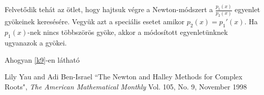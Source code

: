 \documentclass[a4paper,12pt]{report}
\begin{document}
			Felvetődik tehát az ötlet, hogy hajtsuk végre a Newton-módszert a $\frac{p_1(x)}{p_2(x)}$ egyenlet gyökeinek keresésére. Vegyük azt a speciális esetet amikor $p_2(x)=p_1'(x)$. Ha $p_1(x)$-nek nincs többszörös gyöke, akkor a módosított egyenletünknek ugyanazok a gyökei.
			\begin{figure}[htp]
           		\hfill
           		\hfill
            	\hfill
                \caption{}
           	\end{figure}
			
            Ahogyan \ref{k9}-en látható
	\begin{thebibliography}{99}
		 Lily Yau and Adi Ben-Israel ``The Newton and Halley Methods for Complex Roots", \emph{The American Mathematical Monthly} Vol. 105, No. 9, November 1998 %

	\end{thebibliography}
\end{document}
